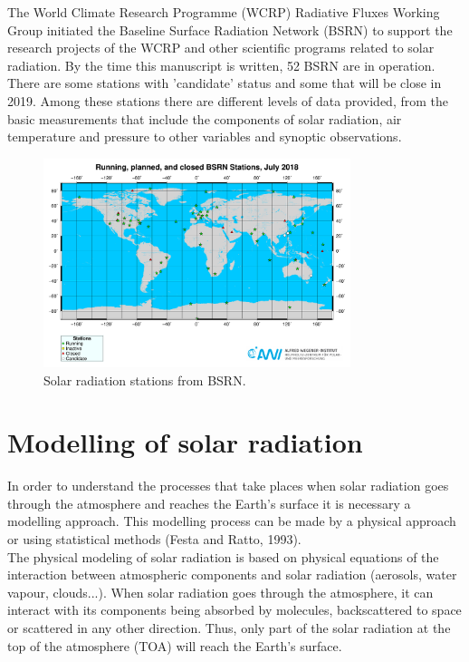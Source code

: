 The World Climate Research Programme (WCRP) Radiative Fluxes Working Group initiated the Baseline Surface Radiation Network (BSRN) to support the research projects of the WCRP and other scientific programs related to solar radiation. By the time this manuscript is written, 52 BSRN are in operation. There are some stations with 'candidate' status and some that will be close in 2019. Among these stations there are different levels of data provided, from the basic measurements that include the components of solar radiation, air temperature and pressure to other variables and synoptic observations.

\begin{figure}[h]
  \centering
  \includegraphics[width=0.8\textwidth]{DataMethodsFIGS/bsrn.pdf}
  \caption{Solar radiation stations from BSRN.}
 \label{fig:bsrnstations}
\end{figure}

\section{Modelling of solar radiation}

In order to understand the processes that take places when solar radiation goes through the atmosphere and reaches the Earth's surface it is necessary a modelling approach. This modelling process can be made by a physical approach or using statistical methods (Festa and Ratto, 1993).\\

The physical modeling of solar radiation is based on physical equations of the interaction between atmospheric components and solar radiation (aerosols, water vapour, clouds...). When solar radiation goes through the atmosphere, it can interact with its components being absorbed by molecules, backscattered to space or scattered in any other direction. Thus, only part of the solar radiation at the top of the atmosphere (TOA) will reach the Earth's surface.\\ 

